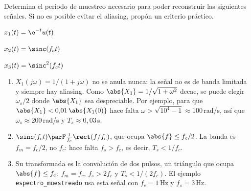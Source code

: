 \documentclass[11pt,a4paper]{scrartcl}
\begin{document}
\begin{ejercicio}
  Determina el periodo de muestreo necesario para poder reconstruir las siguientes señales. Si no es posible evitar el aliasing, propón un criterio práctico.
  \begin{incisos}[3]
    \item $x_1(t)=\e^{-t}u(t)$
    \item $x_2(t)=\sinc(f_ct)$
    \item $x_3(t)=\sinc^2(f_ct)$
  \end{incisos}
\end{ejercicio}
\begin{solucion}
  \begin{enumerate}[label=\alph*)]
    \item $X_1(j\omega)=1/(1+j\omega)$ no se anula nunca: la señal no es de banda limitada y siempre hay aliasing. Como $\abs{X_1}=1/\sqrt{1+\omega^2}$ decae, se puede elegir $\omega_s/2$ donde $\abs{X_1}$ sea despreciable. Por ejemplo, para que $\abs{X_1}<0{,}01\,\abs{X_1(0)}$ hace falta $\omega>\sqrt{10^4-1}\approx100$\,rad/s, así que $\omega_s\approx200$\,rad/s y $T_s\approx0{,}03$\,s.
    \item $\sinc(f_ct)\parF\frac{1}{f_c}\rect(f/f_c)$, que ocupa $\abs{f}\le f_c/2$. La banda es $f_m=f_c/2$, no $f_c$: hace falta $f_s>f_c$, es decir, $T_s<1/f_c$.
    \item Su transformada es la convolución de dos pulsos, un triángulo que ocupa $\abs{f}\le f_c$: $f_m=f_c$, $f_s>2f_c$ y $T_s<1/(2f_c)$. El ejemplo \texttt{espectro\_muestreado} usa esta señal con $f_c=1$\,Hz y $f_s=3$\,Hz.
  \end{enumerate}
\end{solucion}
\end{document}
